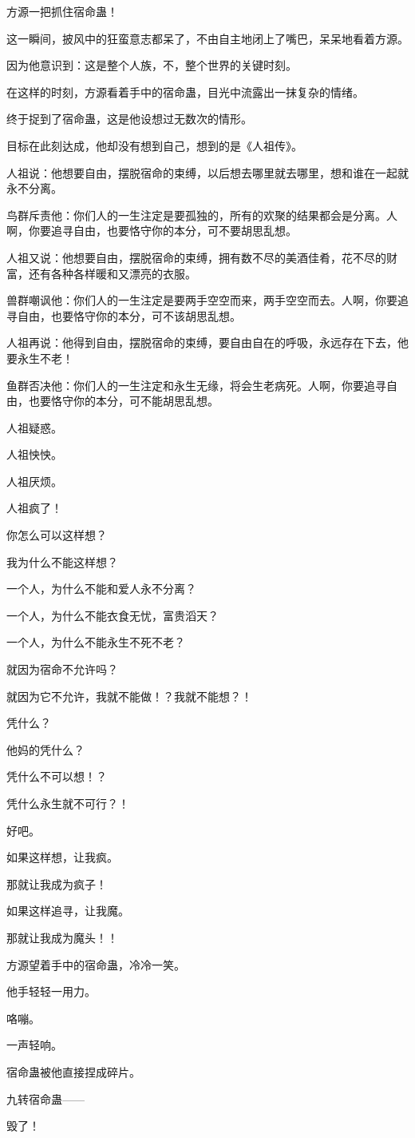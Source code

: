 \begin{this_body}
方源一把抓住宿命蛊！

这一瞬间，披风中的狂蛮意志都呆了，不由自主地闭上了嘴巴，呆呆地看着方源。

因为他意识到：这是整个人族，不，整个世界的关键时刻。

在这样的时刻，方源看着手中的宿命蛊，目光中流露出一抹复杂的情绪。

终于捉到了宿命蛊，这是他设想过无数次的情形。

目标在此刻达成，他却没有想到自己，想到的是《人祖传》。

人祖说：他想要自由，摆脱宿命的束缚，以后想去哪里就去哪里，想和谁在一起就永不分离。

鸟群斥责他：你们人的一生注定是要孤独的，所有的欢聚的结果都会是分离。人啊，你要追寻自由，也要恪守你的本分，可不要胡思乱想。

人祖又说：他想要自由，摆脱宿命的束缚，拥有数不尽的美酒佳肴，花不尽的财富，还有各种各样暖和又漂亮的衣服。

兽群嘲讽他：你们人的一生注定是要两手空空而来，两手空空而去。人啊，你要追寻自由，也要恪守你的本分，可不该胡思乱想。

人祖再说：他得到自由，摆脱宿命的束缚，要自由自在的呼吸，永远存在下去，他要永生不老！

鱼群否决他：你们人的一生注定和永生无缘，将会生老病死。人啊，你要追寻自由，也要恪守你的本分，可不能胡思乱想。

人祖疑惑。

人祖怏怏。

人祖厌烦。

人祖疯了！

你怎么可以这样想？

我为什么不能这样想？

一个人，为什么不能和爱人永不分离？

一个人，为什么不能衣食无忧，富贵滔天？

一个人，为什么不能永生不死不老？

就因为宿命不允许吗？

就因为它不允许，我就不能做！？我就不能想？！

凭什么？

他妈的凭什么？

凭什么不可以想！？

凭什么永生就不可行？！

好吧。

如果这样想，让我疯。

那就让我成为疯子！

如果这样追寻，让我魔。

那就让我成为魔头！！

方源望着手中的宿命蛊，冷冷一笑。

他手轻轻一用力。

咯嘣。

一声轻响。

宿命蛊被他直接捏成碎片。

九转宿命蛊——

毁了！

\end{this_body}

